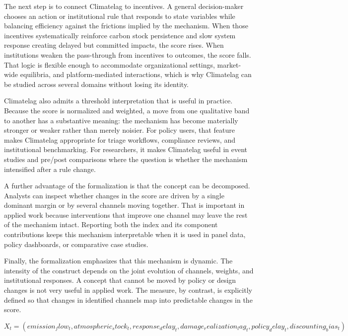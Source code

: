 \documentclass[12pt]{article}
\begin{document}
The next step is to connect Climatelag to incentives. A general decision-maker chooses an action or institutional rule that responds to state variables while balancing efficiency against the frictions implied by the mechanism. When those incentives systematically reinforce carbon stock persistence and slow system response creating delayed but committed impacts, the score rises. When institutions weaken the pass-through from incentives to outcomes, the score falls. That logic is flexible enough to accommodate organizational settings, market-wide equilibria, and platform-mediated interactions, which is why Climatelag can be studied across several domains without losing its identity.

Climatelag also admits a threshold interpretation that is useful in practice. Because the score is normalized and weighted, a move from one qualitative band to another has a substantive meaning: the mechanism has become materially stronger or weaker rather than merely noisier. For policy users, that feature makes Climatelag appropriate for triage workflows, compliance reviews, and institutional benchmarking. For researchers, it makes Climatelag useful in event studies and pre/post comparisons where the question is whether the mechanism intensified after a rule change.

A further advantage of the formalization is that the concept can be decomposed. Analysts can inspect whether changes in the score are driven by a single dominant margin or by several channels moving together. That is important in applied work because interventions that improve one channel may leave the rest of the mechanism intact. Reporting both the index and its component contributions keeps this mechanism interpretable when it is used in panel data, policy dashboards, or comparative case studies.

Finally, the formalization emphasizes that this mechanism is dynamic. The intensity of the construct depends on the joint evolution of channels, weights, and institutional responses. A concept that cannot be moved by policy or design changes is not very useful in applied work. The measure, by contrast, is explicitly defined so that changes in identified channels map into predictable changes in the score.

\begin{equation}
X_t = (emission_flow_t, atmospheric_stock_t, response_delay_t, damage_realization_lag_t, policy_delay_t, discounting_bias_t)
\label{eq:channels}
\end{equation}
\end{document}
